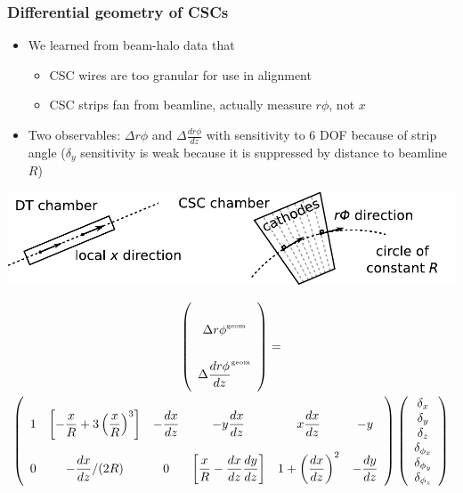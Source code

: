 \documentclass[compress]{beamer}
\begin{document}
\begin{frame}
\frametitle{Differential geometry of CSCs}

\begin{itemize}
\item We learned from beam-halo data that
\begin{itemize}
\item CSC wires are too granular for use in alignment
\item CSC strips fan from beamline, actually measure $r\phi$, not $x$
\end{itemize}

\item Two observables: $\Delta r\phi$ and $\Delta \frac{dr\phi}{dz}$
  with sensitivity to 6 DOF because of strip angle ($\delta_y$
  sensitivity is weak because it is suppressed by distance to beamline $R$)
\end{itemize}

\hfill \includegraphics[width=0.65\linewidth]{strip_direction.pdf}

\vspace{-2 cm}
{\scriptsize 
\begin{multline*}
\renewcommand{\arraystretch}{3}
\left(\begin{array}{c}
{\Delta r\phi}^{\mbox{\tiny geom}} \\
{\Delta \dfrac{dr\phi}{dz}}^{\mbox{\tiny geom}} \\
\end{array}\right)
= \\
{\renewcommand{\arraystretch}{3}
\left(\begin{array}{c c c c c c}
1 & \left[ -\dfrac{x}{R} + 3\left(\dfrac{x}{R}\right)^3 \right] & -\dfrac{dx}{dz}  & -y \dfrac{dx}{dz} & x \dfrac{dx}{dz} & -y \\
0 & -\dfrac{dx}{dz}/(2R) & 0 & \left[ \dfrac{x}{R} - \dfrac{dx}{dz}\dfrac{dy}{dz} \right] & 1 + \left(\dfrac{dx}{dz}\right)^2 & -\dfrac{dy}{dz}
\end{array}\right)}
\renewcommand{\arraystretch}{1}
\left(\begin{array}{c}
\delta_x \\
\delta_y \\
\delta_z \\
\delta_{\phi_x} \\
\delta_{\phi_y} \\
\delta_{\phi_z}
\end{array}\right)
\label{eqn:cscmatrix}
\end{multline*}}
\end{frame}
\end{document}
